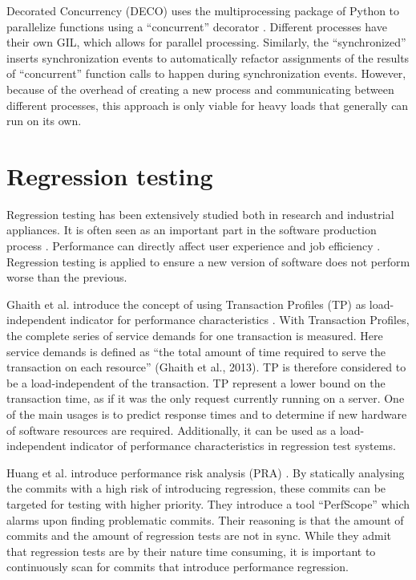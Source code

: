 Decorated Concurrency (DECO) uses the multiprocessing package of Python to parallelize functions using a ``concurrent'' decorator \cite{sherman2016deco}.
Different processes have their own GIL, which allows for parallel processing.
Similarly, the ``synchronized''  inserts synchronization events to automatically refactor assignments of the results of ``concurrent'' function calls to happen during synchronization events.
However, because of the overhead of creating a new process and communicating between different processes, this approach is only viable for heavy loads that generally can run on its own.

\section{Regression testing}
Regression testing has been extensively studied both in research and industrial appliances.
It is often seen as an important part in the software production process \cite{ghaith2013profile}.
Performance can directly affect user experience and job efficiency \cite{huang2014performance}.
Regression testing is applied to ensure a new version of software does not perform worse than the previous.

Ghaith et al. introduce the concept of using Transaction Profiles (TP) as load-independent indicator for performance characteristics \cite{ghaith2013profile}. 
With Transaction Profiles, the complete series of service demands for one transaction is measured.
Here service demands is defined as \enquote{the total amount of time required to serve the transaction
on each resource} (Ghaith et al., 2013).
TP is therefore considered to be a load-independent of the transaction.
TP represent a lower bound on the transaction time, as if it was the only request currently running on a server.
One of the main usages is to predict response times and to determine if new hardware of software resources are required.
Additionally, it can be used as a load-independent indicator of performance characteristics in regression test systems.

Huang et al. introduce performance risk analysis (PRA) \cite{huang2014performance}.
By statically analysing the commits with a high risk of introducing regression, these commits can be targeted for testing with higher priority.
They introduce a tool \enquote{PerfScope} which alarms upon finding problematic commits.
Their reasoning is that the amount of commits and the amount of regression tests are not in sync.
While they admit that regression tests are by their nature time consuming, it is important to continuously scan for commits that introduce performance regression.


